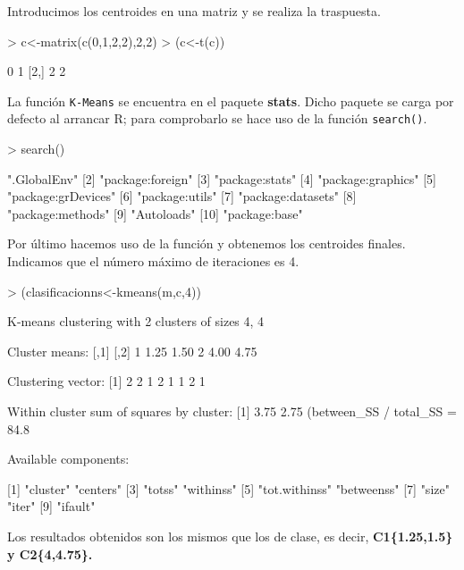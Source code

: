 \documentclass [a4paper] {article}
\begin{document}
\bigskip
Introducimos los centroides en una matriz y se realiza la traspuesta.
\begin{Schunk}
\begin{Sinput}
> c<-matrix(c(0,1,2,2),2,2)
> (c<-t(c))
\end{Sinput}
\begin{Soutput}
     [,1] [,2]
[1,]    0    1
[2,]    2    2
\end{Soutput}
\end{Schunk}

\bigskip
La función \texttt{K-Means} se encuentra en el paquete \textbf{stats}. Dicho paquete se carga por defecto al
arrancar R; para comprobarlo se hace uso de la función \texttt{search()}.
\begin{Schunk}
\begin{Sinput}
> search()
\end{Sinput}
\begin{Soutput}
 [1] ".GlobalEnv"       
 [2] "package:foreign"  
 [3] "package:stats"    
 [4] "package:graphics" 
 [5] "package:grDevices"
 [6] "package:utils"    
 [7] "package:datasets" 
 [8] "package:methods"  
 [9] "Autoloads"        
[10] "package:base"     
\end{Soutput}
\end{Schunk}

\bigskip
Por último hacemos uso de la función y obtenemos los centroides finales. Indicamos que el número máximo de
iteraciones es 4.
\begin{Schunk}
\begin{Sinput}
> (clasificacionns<-kmeans(m,c,4))
\end{Sinput}
\begin{Soutput}
K-means clustering with 2 clusters of sizes 4, 4

Cluster means:
  [,1] [,2]
1 1.25 1.50
2 4.00 4.75

Clustering vector:
[1] 2 2 1 2 1 1 2 1

Within cluster sum of squares by cluster:
[1] 3.75 2.75
 (between_SS / total_SS =  84.8 %

Available components:

[1] "cluster"      "centers"     
[3] "totss"        "withinss"    
[5] "tot.withinss" "betweenss"   
[7] "size"         "iter"        
[9] "ifault"      
\end{Soutput}
\end{Schunk}

\bigskip
Los resultados obtenidos son los mismos que los de clase, es decir, \textbf{C1\{1.25,1.5\} y C2\{4,4.75\}.}
\end{document}
